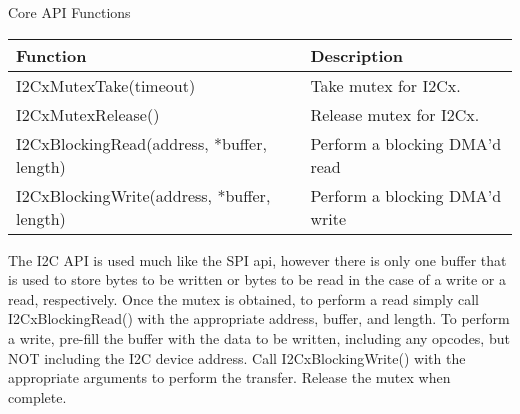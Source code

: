 \documentclass{article}
\begin{document}
Core API Functions
\begin{center}
\begin{tabular}{| l | l |}
    \hline 
    Function & Description \\ \hline
    I2CxMutexTake(timeout) & Take mutex for I2Cx.  \\ \hline
    I2CxMutexRelease() & Release mutex for I2Cx. \\ \hline
    I2CxBlockingRead(address, *buffer, length) & Perform a blocking DMA'd read \\ \hline
    I2CxBlockingWrite(address, *buffer, length) & Perform a blocking DMA'd write \\ \hline
\end{tabular}
\end{center}

The I2C API is used much like the SPI api, however there is only one buffer that
is used to store bytes to be written or bytes to be read in the case of a write
or a read, respectively. Once the mutex is obtained, to perform a read simply
call I2CxBlockingRead() with the appropriate address, buffer, and length. To 
perform a write, pre-fill the buffer with the data to be written, including any
opcodes, but NOT including the I2C device address. Call I2CxBlockingWrite() with
the appropriate arguments to perform the transfer. Release the mutex when complete.
\end{document}
